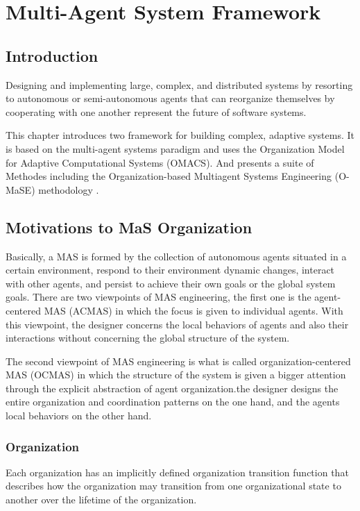 
\chapter{\label{cha:org}Multi-Agent System Framework}


\section{Introduction}
Designing and implementing large, complex, and distributed systems by resorting to autonomous 
or semi-autonomous agents that can reorganize themselves by cooperating with one another 
represent the future of software systems\cite{omacs0}. 

This chapter introduces two framework for building complex, adaptive systems. 
It is based on the multi-agent systems paradigm and uses the Organization Model for Adaptive 
Computational Systems (OMACS). 
And presents a suite of Methodes including the Organization-based Multiagent Systems Engineering 
(O-MaSE) methodology \cite{omacs4}.


\section{Motivations to MaS Organization}
 
Basically, a MAS is formed by the collection of autonomous agents situated in a certain environment, respond
to their environment dynamic changes, interact with other agents, and persist to achieve their own goals or the global
system goals. There are two viewpoints of MAS engineering, the first one is the agent-centered MAS (ACMAS) in which
the focus is given to individual agents. With this viewpoint, the designer concerns the local behaviors of agents and also
their interactions without concerning the global structure of the system\cite{omacs3}.

The second viewpoint of MAS engineering is what is called
organization-centered MAS (OCMAS) in which the structure
of the system is given a bigger attention through the explicit
abstraction of agent organization\cite{omacs3}.the
designer designs the entire organization and coordination
patterns on the one hand, and the agents local behaviors on
the other hand.

\subsection{Organization}
Each organization has an implicitly defined organization transition function 
that describes how the organization may transition from one organizational state 
to another over the lifetime of the organization\cite{omacs2}.
	
